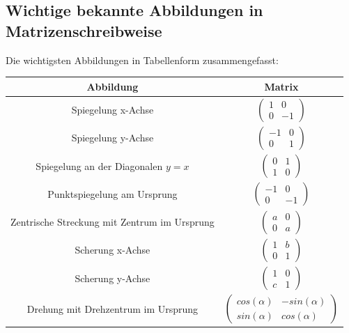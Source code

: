 \documentclass[a4paper,10pt,DIV9, BCOR12mm, oneside,openright,openbib]{scrreprt}
\theoremstyle{definition}
\theoremstyle{plain}
\begin{document}
\subsection{Wichtige bekannte Abbildungen in Matrizenschreibweise}
Die wichtigsten Abbildungen in Tabellenform zusammengefasst:\\
    \begin{tabular}{|c|c|}
    \hline
    Abbildung & Matrix \\  \hline
    Spiegelung x-Achse & $\begin{pmatrix} 1 & 0 \\ 0 & -1 \end{pmatrix}$ \\ \hline
    Spiegelung y-Achse & $\begin{pmatrix} -1 & 0 \\ 0 & 1 \end{pmatrix}$ \\  \hline
    Spiegelung an der Diagonalen $y=x$ & $\begin{pmatrix} 0 & 1 \\ 1 & 0 \end{pmatrix}$ \\  \hline
    Punktspiegelung am Ursprung & $\begin{pmatrix} -1 & 0 \\ 0 & -1 \end{pmatrix}$ \\  \hline
    Zentrische Streckung mit Zentrum im Ursprung & $\begin{pmatrix} a & 0 \\ 0 & a \end{pmatrix}$ \\  \hline
    Scherung x-Achse & $\begin{pmatrix} 1 & b \\ 0 & 1 \end{pmatrix}$ \\  \hline
    Scherung y-Achse & $\begin{pmatrix} 1 & 0 \\ c & 1 \end{pmatrix}$ \\  \hline
    Drehung mit Drehzentrum im Ursprung & $\begin{pmatrix} cos(\alpha) & -sin(\alpha) \\ sin(\alpha) & cos(\alpha) \end{pmatrix}$ \\  \hline
    \end{tabular}
    
\end{document}

